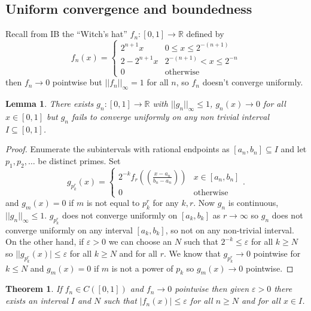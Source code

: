 \documentclass[a4paper, 10pt, twocolumn]{amsart}
\newtheorem*{theorem}{Theorem}
\newtheorem*{lemma}{Lemma}
\theoremstyle{definition}
\newcommand{\bb}[1]{\mathbb{#1}}
\newcommand{\eps}[0]{\varepsilon}
\newcommand{\sbs}[0]{\subseteq}
\newcommand{\1}{\mathbbm{1}}
\begin{document}
\subsection*{Uniform convergence and boundedness}

Recall from IB the ``Witch's hat'' $f_n:[0,1] \to \bb{R}$ defined by 
\[f_n(x) = \begin{cases}
    2^{n+1}x & 0 \le x\le 2^{-(n+1)} \\ 2-2^{n+1}x & 2^{-(n+1)} < x \le 2^{-n} \\ 0&\text{otherwise}
\end{cases}\]
then $f_n \to 0$ pointwise but $||f_n||_{\infty} = 1$ for all $n$, so $f_n$ doesn't converge uniformly.

\begin{lemma}
    There exists $g_n:[0,1] \to \bb{R}$ with $||g_n||_\infty \le 1$, $g_n(x) \to 0$ for all $x \in [0,1]$ but $g_n$ fails to converge uniformly on any non trivial interval $I\sbs [0,1]$.
\end{lemma}

\begin{proof}
    Enumerate the subintervals with rational endpoints as $[a_n,b_n] \sbs I$ and let $p_1,p_2,\ldots$ be distinct primes. Set \[g_{p_k^r}(x)=\begin{cases}
        2^{-k}f_r\left(\left(\frac{x-a_n}{b_n-a_n}\right)\right) & x \in [a_n,b_n]\\
        0 & \text{otherwise}
    \end{cases}.\]
    and $g_m(x) = 0$ if $m$ is not equal to $p_k^r$ for any $k,r$. Now $g_n$ is continuous, $||g_n||_\infty \le 1$. $g_{p_k^r}$ does not converge uniformly on $[a_k,b_k]$ as $r\to \infty$ so $g_n$ does not converge uniformly on any interval $[a_k,b_k]$, so not on any non-trivial interval.\\

    On the other hand, if $\eps>0$ we can choose an $N$ such that $2^{-k} \le \eps$ for all $k\ge N$ so $||g_{p_k^r}(x)| \le \eps$ for all $k\ge N$ and for all $r$. We know that $g_{p_k^r} \to 0$ pointwise for $k \le N$ and $g_m(x) = 0$ if $m$ is not a power of $p_k$ so $g_m(x) \to 0$ pointwise.
\end{proof}

\begin{theorem}
    If $f_n \in C([0,1])$ and $f_n \to 0$ pointwise then given $\eps>0$ there exists an interval $I$ and $N$ such that $|f_n(x)|\le \eps$ for all $n\ge N$ and for all $x\in I$. 
\end{theorem}
\end{document}
